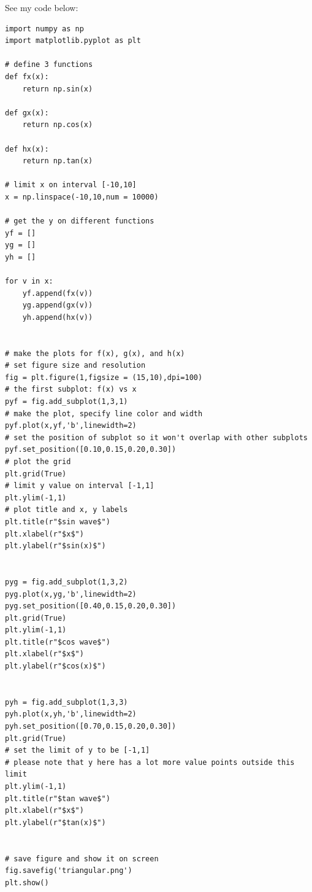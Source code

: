 See my code below: 
\begin{verbatim}
import numpy as np
import matplotlib.pyplot as plt

# define 3 functions
def fx(x):
    return np.sin(x)

def gx(x):
    return np.cos(x)

def hx(x):
    return np.tan(x)

# limit x on interval [-10,10]
x = np.linspace(-10,10,num = 10000)

# get the y on different functions
yf = []
yg = []
yh = []

for v in x:
    yf.append(fx(v))
    yg.append(gx(v))
    yh.append(hx(v))


# make the plots for f(x), g(x), and h(x)
# set figure size and resolution
fig = plt.figure(1,figsize = (15,10),dpi=100)
# the first subplot: f(x) vs x
pyf = fig.add_subplot(1,3,1)
# make the plot, specify line color and width
pyf.plot(x,yf,'b',linewidth=2)
# set the position of subplot so it won't overlap with other subplots
pyf.set_position([0.10,0.15,0.20,0.30])
# plot the grid
plt.grid(True)
# limit y value on interval [-1,1]
plt.ylim(-1,1)
# plot title and x, y labels
plt.title(r"$sin wave$")
plt.xlabel(r"$x$")
plt.ylabel(r"$sin(x)$")


pyg = fig.add_subplot(1,3,2)
pyg.plot(x,yg,'b',linewidth=2)
pyg.set_position([0.40,0.15,0.20,0.30])
plt.grid(True)
plt.ylim(-1,1)
plt.title(r"$cos wave$")
plt.xlabel(r"$x$")
plt.ylabel(r"$cos(x)$")


pyh = fig.add_subplot(1,3,3)
pyh.plot(x,yh,'b',linewidth=2)
pyh.set_position([0.70,0.15,0.20,0.30])
plt.grid(True)
# set the limit of y to be [-1,1]
# please note that y here has a lot more value points outside this limit
plt.ylim(-1,1)
plt.title(r"$tan wave$")
plt.xlabel(r"$x$")
plt.ylabel(r"$tan(x)$")


# save figure and show it on screen
fig.savefig('triangular.png')
plt.show()
                  
\end{verbatim}


